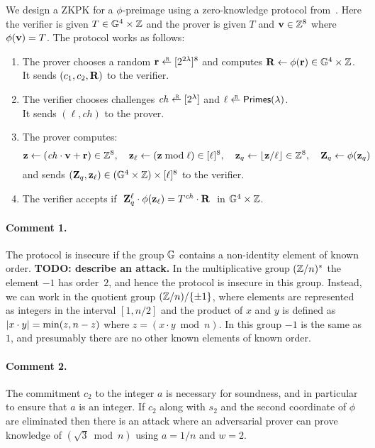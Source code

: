 \documentclass[11pt]{article}
\begin{document}
\begin{itemize}
We design a ZKPK for a $\phi$-preimage 
using a zero-knowledge protocol from~\cite[\S 3.5]{ourpaper}.
Here the verifier is given $T \in \mathbb G^4 \times \mathbb Z$ 
and the prover is given $T$ and $\mathbf{v} \in \mathbb Z^8$
where $\phi(\mathbf{v}) = T$. 
The protocol works as follows:
\begin{enumerate}
\item The prover chooses a random $\rv \rgets \range{2^{2\lambda}}^8$
and computes $\mathbf{R} \gets \phi(\mathbf{r}) \in \mathbb G^4 \times \mathbb Z$. \\
It sends $(c_1, c_2, \mathbf{R})$ to the verifier.

\item The verifier chooses challenges $\mathit{ch} \rgets \range{2^\lambda}$
and $\ell \rgets \primes$. \\
It sends $(\ell, \mathit{ch})$ to the prover.

\item The prover computes:
\[  \mathbf{z} \gets (\mathit{ch} \cdot \mathbf{v} + \mathbf{r}) \in \mathbb Z^8, \quad
    \mathbf{z}_\ell \gets (\mathbf{z} \bmod \ell) \in [{\ell}]^8, \quad
    \mathbf{z}_q \gets \lfloor \mathbf{z} / \ell \rfloor \in \mathbb Z^8, \quad
    \mathbf{Z}_q \gets \phi(\mathbf{z}_q)  
\]
and sends $(\mathbf{Z}_q, \mathbf{z}_\ell) \in (\mathbb G^4 \times \mathbb Z) \times [{\ell}]^8$ 
to the verifier. 

\item The verifier accepts if 
$\ \mathbf{Z}_q^\ell \cdot \phi(\mathbf{z}_\ell) = T^\mathit{ch} \cdot \mathbf{R}\ $ in 
$\mathbb G^4 \times \mathbb Z$.
\end{enumerate}
\end{itemize}


\paragraph{Comment 1.}
The protocol is insecure if the group $\mathbb G$ contains a non-identity
element of known order.  {\bf TODO: describe an attack.}
In the multiplicative group $(\mathbb Z/n)^*$ the
element $-1$ has order~$2$, and hence the protocol is insecure in this
group.  Instead, we can work in the quotient group $(\mathbb Z/n)/\{\pm 1\}$, 
where elements are represented as integers in the interval $[1,n/2]$
and the product of $x$ and $y$ is defined as 
$\lvert x \cdot y \rvert = \min(z, n-z)$ where $z = (x \cdot y \bmod n)$.
In this group $-1$ is the same as $1$, and presumably there are
no other known elements of known order.

\paragraph{Comment 2.}
The commitment $c_2$ to the integer $a$ is necessary for soundness,
and in particular to ensure that $a$ is an integer.  If $c_2$ along
with $s_2$ and the second coordinate of $\phi$ are eliminated then there
is an attack where an adversarial prover can prove knowledge of
$(\sqrt{3} \bmod n)$ using $a = 1/n$ and $w = 2$.
\end{document}
